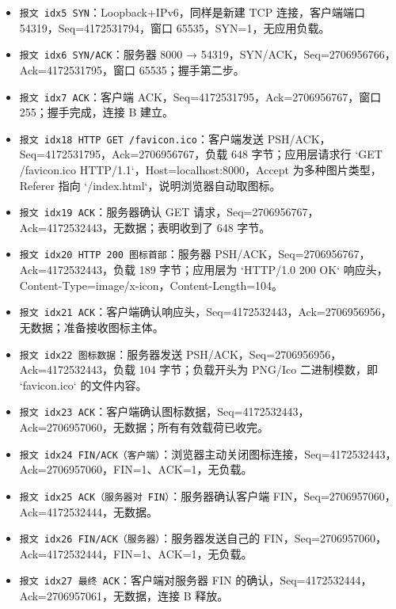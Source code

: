 \documentclass[a4paper]{article}
\begin{document}
	\begin{itemize}
		\item \texttt{报文 idx5 SYN}：Loopback+IPv6，同样是新建 TCP 连接，客户端端口 54319，Seq=4172531794，窗口 65535，SYN=1，无应用负载。
		\item \texttt{报文 idx6 SYN/ACK}：服务器 8000 → 54319，SYN/ACK，Seq=2706956766，Ack=4172531795，窗口 65535；握手第二步。
		\item \texttt{报文 idx7 ACK}：客户端 ACK，Seq=4172531795，Ack=2706956767，窗口 255；握手完成，连接 B 建立。
		\item \texttt{报文 idx18 HTTP GET /favicon.ico}：客户端发送 PSH/ACK，Seq=4172531795，Ack=2706956767，负载 648 字节；应用层请求行 `GET /favicon.ico HTTP/1.1`，Host=localhost:8000，Accept 为多种图片类型，Referer 指向 `/index.html`，说明浏览器自动取图标。
		\item \texttt{报文 idx19 ACK}：服务器确认 GET 请求，Seq=2706956767，Ack=4172532443，无数据；表明收到了 648 字节。
		\item \texttt{报文 idx20 HTTP 200 图标首部}：服务器 PSH/ACK，Seq=2706956767，Ack=4172532443，负载 189 字节；应用层为 `HTTP/1.0 200 OK` 响应头，Content-Type=image/x-icon，Content-Length=104。
		\item \texttt{报文 idx21 ACK}：客户端确认响应头，Seq=4172532443，Ack=2706956956，无数据；准备接收图标主体。
		\item \texttt{报文 idx22 图标数据}：服务器发送 PSH/ACK，Seq=2706956956，Ack=4172532443，负载 104 字节；负载开头为 PNG/Ico 二进制模数，即 `favicon.ico` 的文件内容。
		\item \texttt{报文 idx23 ACK}：客户端确认图标数据，Seq=4172532443，Ack=2706957060，无数据；所有有效载荷已收完。
		\item \texttt{报文 idx24 FIN/ACK（客户端）}：浏览器主动关闭图标连接，Seq=4172532443，Ack=2706957060，FIN=1、ACK=1，无负载。
		\item \texttt{报文 idx25 ACK（服务器对 FIN）}：服务器确认客户端 FIN，Seq=2706957060，Ack=4172532444，无数据。
		\item \texttt{报文 idx26 FIN/ACK（服务器）}：服务器发送自己的 FIN，Seq=2706957060，Ack=4172532444，FIN=1、ACK=1，无负载。
		\item \texttt{报文 idx27 最终 ACK}：客户端对服务器 FIN 的确认，Seq=4172532444，Ack=2706957061，无数据，连接 B 释放。
	\end{itemize}
\end{document}
